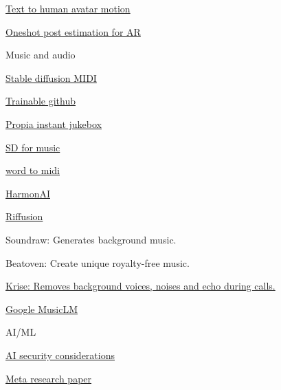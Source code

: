         \href{https://ofa-sys.github.io/MoFusion/}{Text to human avatar
        motion}
       
        \href{https://zju3dv.github.io/onepose_plus_plus/}{Oneshot post
        estimation for AR}
       
     
      Music and audio

       
       
        \href{https://storage.googleapis.com/music-synthesis-with-spectrogram-diffusion/index.html}{Stable
        diffusion MIDI}
       
        \href{https://github.com/teticio/audio-diffusion}{Trainable
        github}
       
        \href{https://app.prodia.com/\#/}{Propia instant jukebox}
       
        \href{https://www.riffusion.com/about}{SD for music}
       
        \href{https://www.musicradar.com/news/audiocipher-word-midi-music-generator-creative-block}{word
        to midi}
       
        \href{https://www.harmonai.org/}{HarmonAI}
       
        \href{https://github.com/riffusion/riffusion-app}{Riffusion}
       
        \href{https://soundraw.io/}{}

         {Soundraw: Generates background music.\\
        }
       
        \href{https://www.beatoven.ai/}{}

         {Beatoven: Create unique royalty-free music.\\
        }
       
        \href{https://krisp.ai/}{Krise: Removes background voices,
        noises and echo during calls.}
       
        \href{https://google-research.github.io/seanet/musiclm/examples/}{Google
        MusicLM}
       
     
   
    AI/ML

     
    \tightlist
     
      \href{https://ico.org.uk/for-organisations/guide-to-data-protection/key-dp-themes/guidance-on-ai-and-data-protection/how-should-we-assess-security-and-data-minimisation-in-ai/}{AI
      security considerations}
     
      \href{https://drive.google.com/file/d/1i4NJKAggS82wqMamCJ1OHRGgViuyoY6R/view}{Meta
      research paper}
     

